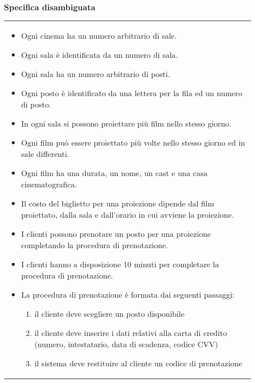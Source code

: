 \subsubsection*{Specifica disambiguata}

\begin{tabularx}{\linewidth}{|X|}
    \hline
    \begin{itemize}
        \item Ogni cinema ha un numero arbitrario di sale.
        \item Ogni sala è identificata da un numero di sala.
        \item Ogni sala ha un numero arbitrario di posti.
        \item Ogni posto è identificato da una lettera per la fila ed un numero
              di posto.
        \item In ogni sala si possono proiettare più film nello stesso giorno.
        \item Ogni film può essere proiettato più volte nello stesso giorno ed
              in sale differenti.
        \item Ogni film ha una durata, un nome, un cast e una
              casa cinematografica.
        \item Il costo del biglietto per una proiezione dipende dal film
              proiettato, dalla sala e dall'orario in cui avviene la proiezione.
        \item I clienti possono prenotare un posto per una proiezione
              completando la procedura di prenotazione.
        \item I clienti hanno a disposizione 10 minuti per completare la
              procedura di prenotazione.
        \item La procedura di prenotazione è formata dai seguenti passaggi:
              \begin{enumerate}
                  \item il cliente deve scegliere un posto disponibile
                  \item il cliente deve inserire i dati relativi alla carta
                        di credito (numero, intestatario, data di scadenza,
                        codice CVV)
                  \item il sistema deve restituire al cliente un codice di
                        prenotazione
              \end{enumerate}

\end{itemize}
\end{tabularx}
